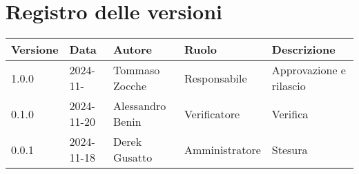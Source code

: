 
\section*{Registro delle versioni}
\begin{table}[H]
     \begin{tabularx}{1.2\textwidth}{|p{2cm}|X|X|p{2.7cm}|p{5cm}|}
        \hline
         \textbf{Versione} &  \textbf{Data} &  \textbf{Autore} &  \textbf{Ruolo} & \textbf{Descrizione} \\
          \hline
          1.0.0& 2024-11- & Tommaso Zocche & Responsabile & Approvazione e rilascio\\
          \hline
          0.1.0& 2024-11-20 & Alessandro Benin & Verificatore & Verifica \\
          \hline
          0.0.1& 2024-11-18 & Derek Gusatto & Amministratore & Stesura \\
          \hline
    \end{tabularx}
\end{table}

